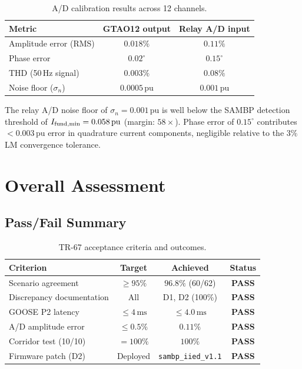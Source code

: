 \documentclass[11pt, a4paper]{article}
\newcommand{\pu}{\,\text{pu}}
\begin{document}
\begin{table}[ht]
\centering
\caption{A/D calibration results across 12 channels.}
\label{tab:calibration}
\begin{tabular}{lcc}
\toprule
Metric & GTAO12 output & Relay A/D input \\
\midrule
Amplitude error (RMS)     & $0.018\%$ & $0.11\%$ \\
Phase error               & $0.02^\circ$ & $0.15^\circ$ \\
THD (50\,Hz signal)       & $0.003\%$ & $0.08\%$ \\
Noise floor ($\sigma_n$)  & $0.0005\pu$ & $0.001\pu$ \\
\bottomrule
\end{tabular}
\end{table}

The relay A/D noise floor of $\sigma_n = 0.001\pu$ is well below the
SAMBP detection threshold of $I_{\rm fund,min} = 0.058\pu$ (margin: $58\times$).
Phase error of $0.15^\circ$ contributes $< 0.003\pu$ error in quadrature
current components, negligible relative to the $3\%$ LM convergence tolerance.

\section{Overall Assessment}
\label{sec:assessment}

\subsection{Pass/Fail Summary}

\begin{table}[ht]
\centering
\caption{TR-67 acceptance criteria and outcomes.}
\label{tab:acceptance}
\begin{tabular}{lccc}
\toprule
Criterion & Target & Achieved & Status \\
\midrule
Scenario agreement         & $\geq 95\%$ & $96.8\%$ (60/62) & \textbf{PASS} \\
Discrepancy documentation  & All         & D1, D2 (100\%) & \textbf{PASS} \\
GOOSE P2 latency           & $\leq 4\,\text{ms}$ & $\leq 4.0\,\text{ms}$ & \textbf{PASS} \\
A/D amplitude error        & $\leq 0.5\%$ & $0.11\%$ & \textbf{PASS} \\
Corridor test (10/10)      & $= 100\%$ & $100\%$ & \textbf{PASS} \\
Firmware patch (D2)        & Deployed   & \texttt{sambp\_iied\_v1.1} & \textbf{PASS} \\
\bottomrule
\end{tabular}
\end{table}
\end{document}
